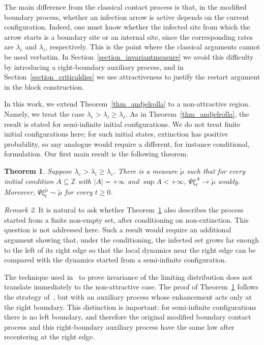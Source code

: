 \documentclass[11pt,a4paper]{article}
\theoremstyle{plain}
\newtheorem{theorem}{Theorem}[section]
\theoremstyle{definition}
\theoremstyle{remark}
\newtheorem{remark}[theorem]{Remark}
\numberwithin{equation}{section}
\begin{document}
	The main difference from the classical contact process is that, in the modified boundary process, whether an infection arrow is active depends on the current configuration. Indeed, one must know whether the infected site from which the arrow starts is a boundary site or an internal site, since the corresponding rates are $\lambda_e$ and $\lambda_i$, respectively. This is the point where the classical arguments cannot be used verbatim. In Section~\ref{section_invariantmeasure} we avoid this difficulty by introducing a right-boundary auxiliary process, and in Section~\ref{section_criticaldies} we use attractiveness to justify the restart argument in the block construction.
	
	In this work, we extend Theorem~\ref{thm_andjelrolla} to a non-attractive region. Namely, we treat the case $\lambda_e>\lambda_i\geq\lambda_c$. As in Theorem~\ref{thm_andjelrolla}, the result is stated for semi-infinite initial configurations. We do not treat finite initial configurations here; for such initial states, extinction has positive probability, so any analogue would require a different, for instance conditional, formulation. Our first main result is the following theorem.
	
	\begin{theorem} \label{thm_measure}
		Suppose $\lambda_e>\lambda_i\geq\lambda_c$. There is a measure $\tilde{\mu}$ such that for every initial condition $A \subseteq \mathbb{Z}$ with $|A|=+\infty$ and $\sup A < +\infty$, $\Psi \xi^A_t \rightarrow \tilde{\mu}$ weakly. Moreover, $\Psi \xi^{\tilde{\mu}}_t \sim \tilde{\mu}$ for every $t \ge 0$.
	\end{theorem}
	
	\begin{remark}
		It is natural to ask whether Theorem~\ref{thm_measure} also describes the process started from a finite non-empty set, after conditioning on non-extinction. This question is not addressed here. Such a result would require an additional argument showing that, under the conditioning, the infected set grows far enough to the left of its right edge so that the local dynamics near the right edge can be compared with the dynamics started from a semi-infinite configuration.
	\end{remark}
	
	The technique used in~\cite{AndjelRolla23} to prove invariance of the limiting distribution does not translate immediately to the non-attractive case. The proof of Theorem~\ref{thm_measure} follows the strategy of~\cite[Theorem 1]{CoxDurrettSchinazi91}, but with an auxiliary process whose enhancement acts only at the right boundary. This distinction is important: for semi-infinite configurations there is no left boundary, and therefore the original modified boundary contact process and this right-boundary auxiliary process have the same law after recentering at the right edge.
	
\end{document}
